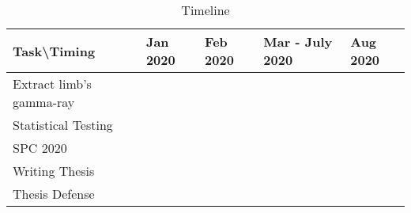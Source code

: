 \begin{table}[h!]
\begin{center}
    \begin{tabular}{|l|l|l|l|l|}
    \hline
    Task\textbackslash{}Timing & Jan 2020                 & Feb 2020                 & Mar - July 2020                                 & Aug 2020                 \\ \hline
    Extract limb's gamma-ray   & \cellcolor[HTML]{FD6864} &                          &                                                 &                          \\ \hline
    Statistical Testing        & \cellcolor[HTML]{32CB00} & \cellcolor[HTML]{32CB00} &                                                 &                          \\ \hline
    SPC 2020                   &                          &                          & \cellcolor[HTML]{34CDF9}{\color[HTML]{333333} } &                          \\ \hline
    Writing Thesis             &                          &                          & \cellcolor[HTML]{6665CD}{\color[HTML]{333333} } &                          \\ \hline
    Thesis Defense             &                          &                          &                                                 & \cellcolor[HTML]{67FD9A} \\ \hline
    \end{tabular}
\end{center}
\caption{Timeline}
\end{table}